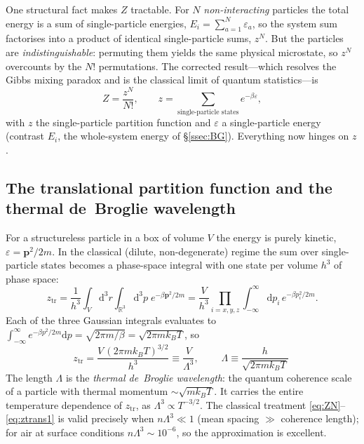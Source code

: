 \documentclass[11pt,a4paper]{article}
\theoremstyle{definition}
\newcommand{\dd}{\mathrm{d}}
\begin{document}
One structural fact makes $Z$ tractable. For $N$ \emph{non-interacting}
particles the total energy is a sum of single-particle energies,
$E_i=\sum_{a=1}^{N}\varepsilon_{a}$, so the system sum factorises into a product
of identical single-particle sums, $z^{N}$. But the particles are
\emph{indistinguishable}: permuting them yields the same physical microstate, so
$z^{N}$ overcounts by the $N!$ permutations. The corrected result---which
resolves the Gibbs mixing paradox and is the classical limit of quantum
statistics---is
\begin{equation}\label{eq:ZN}
Z=\frac{z^{N}}{N!},\qquad
z=\sum_{\text{single-particle states}}e^{-\beta\varepsilon},
\end{equation}
with $z$ the single-particle partition function and $\varepsilon$ a
single-particle energy (contrast $E_i$, the whole-system energy of
\S\ref{ssec:BG}). Everything now hinges on $z$.

\subsection{The translational partition function and the thermal de~Broglie wavelength}
\label{ssec:lambda}

For a structureless particle in a box of volume $V$ the energy is purely
kinetic, $\varepsilon=\mathbf p^{2}/2m$. In the classical (dilute,
non-degenerate) regime the sum over single-particle states becomes a
phase-space integral with one state per volume $h^{3}$ of phase space:
\begin{equation}\label{eq:ztrans1}
z_{\mathrm{tr}}=\frac{1}{h^{3}}\int_V\!\dd^{3}r\int_{\mathbb R^3}\!\dd^{3}p\;
e^{-\beta \mathbf p^{2}/2m}
=\frac{V}{h^{3}}\prod_{i=x,y,z}\int_{-\infty}^{\infty}\!\dd p_i\,
e^{-\beta p_i^{2}/2m}.
\end{equation}
Each of the three Gaussian integrals evaluates to
$\int_{-\infty}^{\infty}e^{-\beta p^{2}/2m}\dd p=\sqrt{2\pi m/\beta}
=\sqrt{2\pi m k_BT}$, so
\begin{equation}\label{eq:ztrans2}
z_{\mathrm{tr}}=\frac{V\,(2\pi m k_BT)^{3/2}}{h^{3}}\equiv\frac{V}{\Lambda^{3}},
\qquad
\boxed{\;\Lambda\equiv\frac{h}{\sqrt{2\pi m k_BT}}\;}
\end{equation}
The length $\Lambda$ is the \emph{thermal de~Broglie wavelength}: the quantum
coherence scale of a particle with thermal momentum
$\sim\!\sqrt{m k_BT}$. It carries the entire temperature dependence of
$z_{\mathrm{tr}}$, as $\Lambda^{3}\propto T^{-3/2}$. The classical treatment
\eqref{eq:ZN}--\eqref{eq:ztrans1} is valid precisely when $n\Lambda^{3}\ll1$
(mean spacing $\gg$ coherence length); for air at surface conditions
$n\Lambda^{3}\sim10^{-6}$, so the approximation is excellent.
\end{document}
